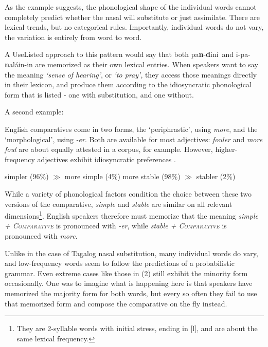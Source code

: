 \documentclass[12]{article}
\begin{document}
		As the example suggests, the phonological shape of the individual words cannot completely predict whether the nasal will substitute or just assimilate.  There are lexical trends, but no categorical rules.  Importantly, individual words do not vary, the variation is entirely from word to word.
		
		A UseListed approach to this pattern would say that both pa{\bf n}-{\bf d}in\'i\textscriptg\ and \textglotstop i-pa-{\bf n}al\'ain-in are memorized as their own lexical entries.  When speakers want to say the meaning {\it `sense of hearing'}, or {\it `to pray'}, they access those meanings directly in their lexicon, and produce them according to the idiosyncratic phonological form that is listed - one with substitution, and one without.
		
		\hspace{2ex}
		
		A second example: 
		
		English comparatives come in two forms, the `periphrastic', using {\it more}, and the `morphological', using {\it -er}.  Both are available for most adjectives: {\it fouler} and {\it more foul} are about equally attested in a corpus, for example.  However, higher-frequency adjectives exhibit idiosyncratic preferences \citet{smithmoorecantwell17}.
		
		\begin{exe}
			\ex \begin{xlist}
				\ex simpler (96\%) $\gg$ more simple (4\%)
				\ex more stable (98\%) $\gg$ stabler (2\%)
			\end{xlist}
		\end{exe}
		
		While a variety of phonological factors condition the choice between these two versions of the comparative, {\it simple} and {\it stable} are similar on all relevant dimensions\footnote{They are 2-syllable words with initial stress, ending in [l], and are about the same lexical frequency.}.  English speakers therefore must memorize that the meaning {\it simple + \textsc{Comparative}} is pronounced with {\it -er}, while {\it stable + \textsc{Comparative}} is pronounced with {\it more}.
		
		Unlike in the case of Tagalog nasal substitution, many individual words do vary, and low-frequency words seem to follow the predictions of a probabilistic grammar.  Even extreme cases like those in (2) still exhibit the minority form occasionally.  One was to imagine what is happening here is that speakers have memorized the majority form for both words, but every so often they fail to use that memorized form and compose the comparative on the fly instead.
		
\end{document}
